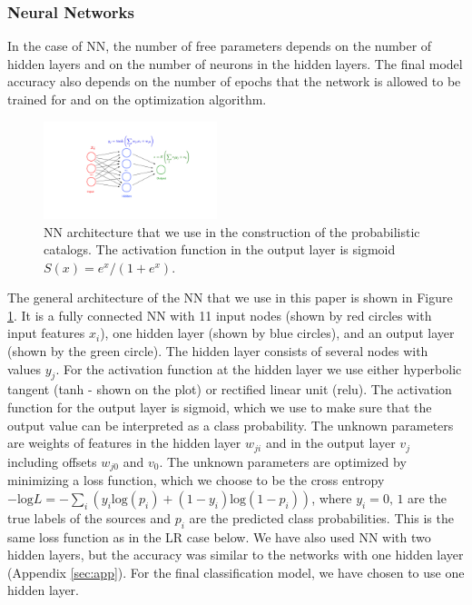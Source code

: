 \subsubsection{Neural Networks}

In the case of NN, the number of free parameters depends on the number of hidden layers and on the number of neurons in the hidden layers. The final model accuracy also depends on the number of epochs that the network is allowed to be trained for and on the optimization algorithm. 

\begin{figure}[h]
\centering
\hspace*{-0.5cm}
\includegraphics[width=0.45\textwidth]{plots/CNN_network.pdf}
\caption{
NN architecture that we use in the construction of the probabilistic catalogs.
The activation function in the output layer is sigmoid $S(x) = {e^{x}}/{(1 + e^{x})}$.
}
\label{fig:NN_structure}
\end{figure}

The general architecture of the NN that we use in this paper is shown in Figure \ref{fig:NN_structure}.
It is a fully connected NN with 11 input nodes (shown by red circles with input features $x_i$), one hidden layer (shown by blue circles),
and an output layer (shown by the green circle).
The hidden layer consists of several nodes with values $y_j$. 
For the activation function at the hidden layer we use either hyperbolic tangent (tanh - shown on the plot) or rectified linear unit (relu).
The activation function for the output layer is sigmoid, which we use to make sure that the output value can be interpreted as a class probability.
The unknown parameters are weights of features in the hidden layer $w_{ji}$ and in the output layer $v_j$ including
offsets $w_{j0}$ and $v_0$.
The unknown parameters are optimized by minimizing a loss function, which we choose to be
the cross entropy
$-\text{log}L = - \sum_i (y_i\text{log}(p_i)+(1-y_i)\text{log}(1 - p_i))$, 
where $y_i = 0,\,1$ are the true labels of the sources and $p_i$ are the predicted class probabilities.
This is the same loss function as in the LR case below.
We have also used NN with two hidden layers, but the accuracy was similar to the networks with one hidden layer (Appendix \ref{sec:app}). For the final classification model, we have chosen to use one hidden layer.

